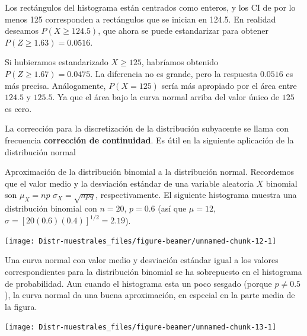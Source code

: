 \documentclass[
  10pt,
  ignorenonframetext,
]{beamer}
\begin{document}
\begin{frame}{}
\protect\hypertarget{section-34}{}
Los rectángulos del histograma están centrados como enteros, y los CI de
por lo menos 125 corresponden a rectángulos que se inician en 124.5. En
realidad deseamos \(P(X \ge 124.5)\), que ahora se puede estandarizar
para obtener \(P(Z \ge 1.63) = 0.0516\).

Si hubieramos estandarizado \(X \ge 125\), habríamos obtenido
\(P(Z \ge 1.67) = 0.0475\). La diferencia no es grande, pero la
respuesta \(0.0516\) es más precisa. Análogamente, \(P(X = 125)\) sería
más apropiado por el área entre \(124.5\) y \(125.5\). Ya que el área
bajo la curva normal arriba del valor único de \(125\) es cero.

La corrección para la discretización de la distribución subyacente se
llama con frecuencia \textbf{corrección de continuidad}. Es útil en la
siguiente aplicación de la distribución normal
\end{frame}

\begin{frame}{Aproximación de la distribución binomial a la distribución
normal.}
\protect\hypertarget{aproximaciuxf3n-de-la-distribuciuxf3n-binomial-a-la-distribuciuxf3n-normal.}{}
Recordemos que el valor medio y la desviación estándar de una variable
aleatoria \(X\) binomial son \(\mu_X = np\) \(\sigma_X = \sqrt{npq}\),
respectivamente. El siguiente histograma muestra una distribución
binomial con \(n = 20\), \(p = 0.6\) (así que \(\mu = 12\),
\(\sigma = [20(0.6)(0.4)]^{1/2} = 2.19\)).

\begin{center}\texttt{[image: Distr-muestrales\_files/figure-beamer/unnamed-chunk-12-1]} \end{center}
\end{frame}

\begin{frame}{}
\protect\hypertarget{section-35}{}
Una curva normal con valor medio y desviación estándar igual a los
valores correspondientes para la distribución binomial se ha sobrepuesto
en el histograma de probabilidad. Aun cuando el histograma esta un poco
sesgado (porque \(p \ne 0.5\)), la curva normal da una buena
aproximación, en especial en la parte media de la figura.

\begin{center}\texttt{[image: Distr-muestrales\_files/figure-beamer/unnamed-chunk-13-1]} \end{center}
\end{frame}
\end{document}
